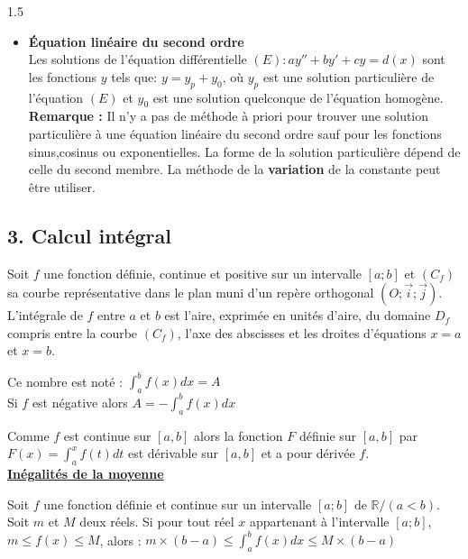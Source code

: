 \documentclass[12pt]{article}
\begin{document}
\begin{spacing}{1.5}
\begin{itemize}
 $y(x)=e^{r_0x}\left[\lambda\cos(\omega x)+\mu \sin(\omega x)\right]$, $(\lambda,\mu)\in \mathbb{R}^2$\\
 \item \quad \textbf{Équation linéaire du second ordre}\\
  Les solutions de l'équation différentielle $(E) : ay''+by'+cy=d(x)$ sont les
 fonctions $y$ tels que: $y=y_p+y_0$,  où $y_p$ est une solution particulière de
 l'équation $(E)$ et $y_0$ est une solution quelconque de l'équation homogène.\\
 \textbf{Remarque :}  Il n'y a pas de méthode à priori pour trouver une solution particulière à une équation linéaire du second ordre sauf pour les fonctions sinus,cosinus ou exponentielles. La forme de la solution particulière dépend de celle du second membre. La méthode de la \textbf{ variation} de la constante peut être utiliser.
\end{itemize}


\quad

\subsection*{3. Calcul intégral}

 Soit $f$ une fonction définie, continue et positive sur un intervalle $[a;b]$ et $(C_f)$ sa courbe représentative dans
 le plan muni d'un repère orthogonal $(O;\overrightarrow{i};\overrightarrow{j}) $.\\
 L'intégrale de $f$ entre $a$ et $b$ est l'aire, exprimée en unités d'aire, du domaine $D_f$ compris entre la courbe
 $(C_f)$, l'axe des abscisses et les droites d'équations $x = a$ et $x = b$.
 
 Ce nombre est noté : $\int_a^bf(x)dx=A$\\
 
 Si $f$ est négative alors $A=-\int_a^bf(x)dx$
 
 Comme $f$ est continue sur $[a,b]$ alors la fonction $F$ définie sur $[a,b]$ par $F(x)=\int_a^xf(t)dt$ est dérivable sur $[a,b]$ et a pour dérivée $f$.\\
 
\textbf{\underline{Inégalités de la moyenne}}

 Soit $f$ une fonction définie et continue sur un intervalle $[a;b]$ de $\mathbb{R}/(a < b )$. Soit $m$ et $M$ deux réels.
 Si pour tout réel $x$ appartenant à l'intervalle $[a;b]$, $m\leq f(x)\leq M$, alors : 
 \(m\times (b-a)\leq \int_a^bf(x)dx\leq M\times (b-a)\)\\
 

\end{spacing}
\end{document}
